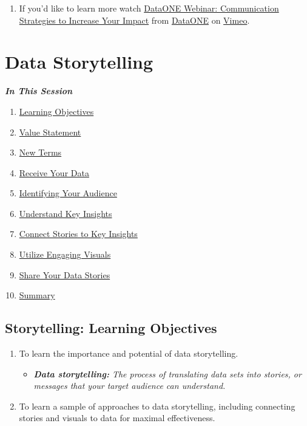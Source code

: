 \documentclass[
]{book}
\providecommand{\tightlist}{%
  \setlength{\itemsep}{0pt}\setlength{\parskip}{0pt}}
\begin{document}
\begin{enumerate}
\def\labelenumi{\arabic{enumi}.}
\tightlist
\item
  If you'd like to learn more watch \href{https://vimeo.com/323261612}{DataONE Webinar: Communication Strategies to Increase Your Impact} from \href{https://vimeo.com/dataoneorg}{DataONE} on \href{https://vimeo.com/}{Vimeo}.
\end{enumerate}

\hypertarget{data-storytelling}{%
\section{Data Storytelling}\label{data-storytelling}}

\textbf{\emph{In This Session}}

\begin{enumerate}
\def\labelenumi{\arabic{enumi}.}
\tightlist
\item
  \protect\hyperlink{storytelling-learning-objectives}{Learning Objectives}
\item
  \protect\hyperlink{storytelling-value-statement}{Value Statement}
\item
  \protect\hyperlink{new-terms}{New Terms}
\item
  \protect\hyperlink{receive-your-data}{Receive Your Data}
\item
  \protect\hyperlink{identifying-your-audience}{Identifying Your Audience}
\item
  \protect\hyperlink{understand-key-insights}{Understand Key Insights}
\item
  \protect\hyperlink{connect-stories-to-key-insights}{Connect Stories to Key Insights}
\item
  \protect\hyperlink{utilize-engaging-visuals}{Utilize Engaging Visuals}
\item
  \protect\hyperlink{share-your-data-stories}{Share Your Data Stories}
\item
  \protect\hyperlink{summary}{Summary}
\end{enumerate}

\hypertarget{storytelling-learning-objectives}{%
\subsection{Storytelling: Learning Objectives}\label{storytelling-learning-objectives}}

\begin{enumerate}
\def\labelenumi{\arabic{enumi}.}
\tightlist
\item
  To learn the importance and potential of data storytelling.

  \begin{itemize}
  \tightlist
  \item
    \emph{\textbf{Data storytelling:} The process of translating data sets into stories, or messages that your target audience can understand.}
  \end{itemize}
\item
  To learn a sample of approaches to data storytelling, including connecting stories and visuals to data for maximal effectiveness.
\end{enumerate}
\end{document}
